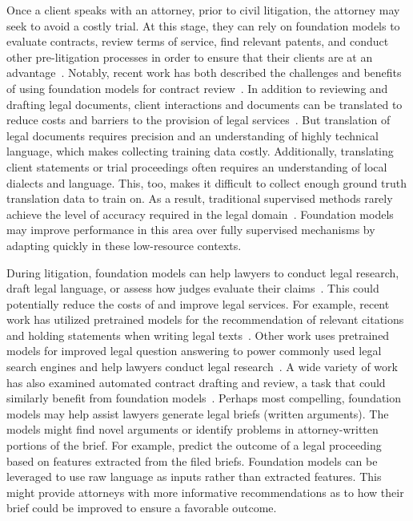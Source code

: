 Once a client speaks with an attorney, prior to civil litigation, the attorney may seek to avoid a costly trial.
At this stage, they can rely on foundation models to evaluate contracts, review terms of service, find relevant patents, and conduct other pre-litigation processes in order to ensure that their clients are at an advantage~\citep{betts2017dawn,elwany2019bert,lippi2019claudette,lee2019patentbert,hendrycks2021cuad,hegel2021law}.
Notably, recent work has both described the challenges and benefits of using foundation models for contract review~\citep{leivaditi2020benchmark,hegel2021law,hendrycks2021cuad}.
In addition to reviewing and drafting legal documents, client interactions and documents can be translated to reduce costs and barriers to the provision of legal services~\citep{cuellar_2019}.
But translation of legal documents requires precision and an understanding of highly technical language, which makes collecting training data costly.
Additionally, translating client statements or trial proceedings often requires an understanding of local dialects and language. This, too, makes it difficult to collect enough ground truth translation data to train on. As a result, traditional supervised methods rarely achieve the level of accuracy required in the legal domain~\citep{vieira2020understanding}.
Foundation models may improve performance in this area over fully supervised mechanisms by adapting quickly in these low-resource contexts. 

During litigation, foundation models can help lawyers to conduct legal research, draft legal language, or assess how judges evaluate their claims~\citep{zheng2021does,huang2021context,ostendorff2021evaluating,vold2021using, chalkidis2020legal, chalkidis2019neural}. 
This could potentially reduce the costs of and improve legal services.
For example, recent work has utilized pretrained models for the recommendation of relevant citations and holding statements when writing legal texts~\citep{zheng2021does,huang2021context,ostendorff2021evaluating}. Other work uses pretrained models for improved legal question answering to power commonly used legal search engines and help lawyers conduct legal research~\citep{vold2021using}. A wide variety of work has also examined automated contract drafting and review, a task that could similarly benefit from foundation models~\citep{hendrycks2021cuad,betts2017dawn}. Perhaps most compelling, foundation models may help assist lawyers  generate legal briefs (written arguments). The models might find novel arguments or identify problems in attorney-written portions of the brief. For example, \citet{tippett2021does} predict the outcome of a legal proceeding based on features extracted from the filed briefs. Foundation models can be leveraged to use raw language as inputs rather than extracted features. This might provide attorneys with more informative recommendations as to how their brief could be improved to ensure a favorable outcome.

